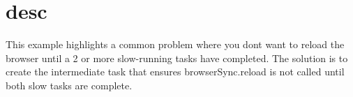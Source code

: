\chapter{desc}
\hypertarget{md__d_1_2_g_i_t_2_food_link_2foodlink_8client_2node__modules_2bs-recipes_2recipes_2gulp_8task_8sequence_2desc}{}\label{md__d_1_2_g_i_t_2_food_link_2foodlink_8client_2node__modules_2bs-recipes_2recipes_2gulp_8task_8sequence_2desc}
This example highlights a common problem where you don\textquotesingle{}t want to reload the browser until a 2 or more slow-\/running tasks have completed. The solution is to create the intermediate task that ensures {\ttfamily browser\+Sync.\+reload} is not called until both slow tasks are complete. 
